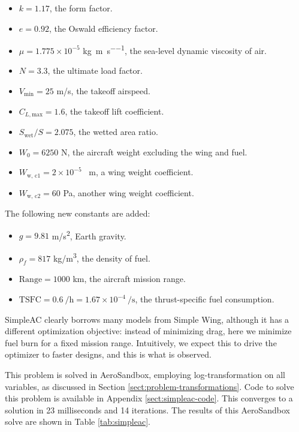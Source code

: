 \begin{example}
    \begin{itemize}[noitemsep]
        \item $k=1.17$, the form factor.
        \item $e = 0.92$, the Oswald efficiency factor.
        \item $\mu = 1.775 \times 10^{-5}$ \si{\kg\per\meter\per\second}, the sea-level dynamic viscosity of air.
        \item $N = 3.3$, the ultimate load factor.
        \item $V_\text{min} = 25$ \si{\meter/\second}, the takeoff airspeed.
        \item $C_{L, \text{max}} = 1.6$, the takeoff lift coefficient.
        \item $S_\text{wet}/S = 2.075$, the wetted area ratio.
        \item $W_0 = 6250$ \si{\newton}, the aircraft weight excluding the wing and fuel.
        \item $W_\text{w, c1} = 2 \times 10^{-5}$ \si{\per\meter}, a wing weight coefficient.
        \item $W_\text{w, c2} = 60$ \si{\Pa}, another wing weight coefficient.
    \end{itemize}

    \noindent
    The following new constants are added:

    \begin{itemize}[noitemsep]
        \item $g = 9.81$ \si{\meter/\second\squared}, Earth gravity.
        \item $\rho_f = 817$ \si{\kg/\meter\cubed}, the density of fuel.
        \item $\text{Range} = 1000$ \si{\kilo\meter}, the aircraft mission range.
        \item $\text{TSFC} = 0.6\ \si{\per\hour} = 1.67 \times 10^{-4}\ \si{\per\second}$, the thrust-specific fuel consumption.
    \end{itemize}

\end{example}

SimpleAC clearly borrows many models from Simple Wing, although it has a different optimization objective: instead of minimizing drag, here we minimize fuel burn for a fixed mission range. Intuitively, we expect this to drive the optimizer to faster designs, and this is what is observed.

This problem is solved in AeroSandbox, employing log-transformation on all variables, as discussed in Section \ref{sect:problem-transformations}. Code to solve this problem is available in Appendix \ref{sect:simpleac-code}. This converges to a solution in 23 milliseconds and 14 iterations. The results of this AeroSandbox solve are shown in Table \ref{tab:simpleac}.

